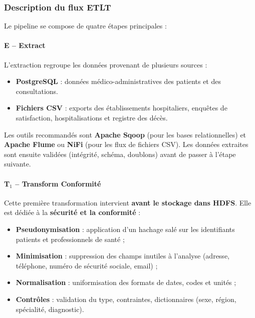\documentclass[12pt,a4paper]{article}
\begin{document}
\subsubsection{Description du flux ETLT}

Le pipeline se compose de quatre étapes principales :

\paragraph{E – Extract}

L'extraction regroupe les données provenant de plusieurs sources :

\begin{itemize}[leftmargin=*]
    \item \textbf{PostgreSQL} : données médico-administratives des patients et des consultations.
    \item \textbf{Fichiers CSV} : exports des établissements hospitaliers, enquêtes de satisfaction, hospitalisations et registre des décès.
\end{itemize}

Les outils recommandés sont \textbf{Apache Sqoop} (pour les bases relationnelles) et \textbf{Apache Flume} ou \textbf{NiFi} (pour les flux de fichiers CSV).
Les données extraites sont ensuite validées (intégrité, schéma, doublons) avant de passer à l'étape suivante.

\paragraph{T$_{1}$ -- Transform Conformité}

Cette première transformation intervient \textbf{avant le stockage dans HDFS}.
Elle est dédiée à la \textbf{sécurité et la conformité} :

\begin{itemize}[leftmargin=*]
    \item \textbf{Pseudonymisation} : application d'un hachage salé sur les identifiants patients et professionnels de santé ;
    \item \textbf{Minimisation} : suppression des champs inutiles à l'analyse (adresse, téléphone, numéro de sécurité sociale, email) ;
    \item \textbf{Normalisation} : uniformisation des formats de dates, codes et unités ;
    \item \textbf{Contrôles} : validation du type, contraintes, dictionnaires (sexe, région, spécialité, diagnostic).
\end{itemize}
\end{document}
